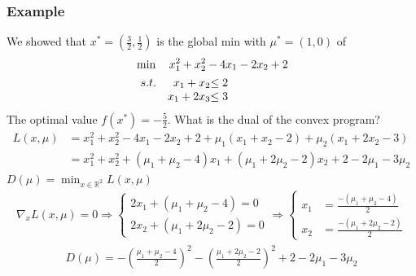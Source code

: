 \documentclass[11pt,a4paper]{article}
\begin{document}
\subsubsection{Example}
We showed that $x^*=(\frac{3}{2},\frac{1}{2})$ is the global min with $\mu^*=(1,0)$ of
\begin{align*}
    &\min\quad x_1^2+x_2^2-4x_1-2x_2+2\\
    &\begin{array}{r@{\quad}r@{}l@{\quad}l}
    s.t.
    &x_1+x_2&\leq 2\\
    &x_1+2x_3&\leq 3\\
\end{array}
\end{align*}
The optimal value $f(x^*)=-\frac{5}{2}$.
What is the dual of the convex program?
\begin{equation}
    \begin{aligned}
        L(x,\mu)&=x_1^2+x_2^2-4x_1-2x_2+2+\mu_1(x_1+x_2-2)+\mu_2(x_1+2x_2-3)\\
        &=x_1^2+x_2^2+(\mu_1+\mu_2-4)x_1+(\mu_1+2\mu_2-2)x_2+2-2\mu_1-3\mu_2
    \end{aligned}
    \nonumber
\end{equation}
$D(\mu)=\min_{x\in \mathbb{R}^2}L(x,\mu)$
\begin{equation}
    \begin{aligned}
        \nabla_x L(x,\mu)=0 \Rightarrow
        \left\{\begin{matrix}
            2x_1+(\mu_1+\mu_2-4)=0\\
            2x_2+(\mu_1+2\mu_2-2)=0
        \end{matrix}\right. \Rightarrow
        \left\{\begin{matrix}
            x_1&=\frac{-(\mu_1+\mu_2-4)}{2}\\
            x_2&=\frac{-(\mu_1+2\mu_2-2)}{2}
        \end{matrix}\right.
    \end{aligned}
    \nonumber
\end{equation}
\begin{equation}
    \begin{aligned}
        D(\mu)=-\left(\frac{\mu_1+\mu_2-4}{2}\right)^2-\left(\frac{\mu_1+2\mu_2-2}{2}\right)^2+2-2\mu_1-3\mu_2
    \end{aligned}
    \nonumber
\end{equation}
\end{document}
